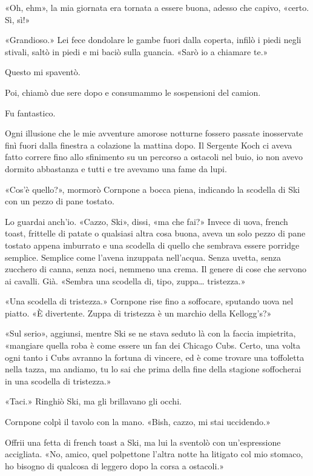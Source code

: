 «Oh, ehm», la mia giornata era tornata a essere buona, adesso che
capivo, «certo. Sì, sì!»

«Grandioso.» Lei fece dondolare le gambe fuori dalla coperta, infilò i
piedi negli stivali, saltò in piedi e mi baciò sulla guancia. «Sarò io a
chiamare te.»

Questo mi spaventò.

Poi, chiamò due sere dopo e consumammo le sospensioni del camion.

Fu fantastico.

\hfill\break

Ogni illusione che le mie avventure amorose notturne fossero passate
inosservate finì fuori dalla finestra a colazione la mattina dopo. Il
Sergente Koch ci aveva fatto correre fino allo sfinimento su un percorso
a ostacoli nel buio, io non avevo dormito abbastanza e tutti e tre
avevamo una fame da lupi.

«Cos'è quello?», mormorò Cornpone a bocca piena, indicando la scodella
di Ski con un pezzo di pane tostato.

Lo guardai anch'io. «Cazzo, Ski», dissi, «ma che fai?» Invece di uova,
french toast, frittelle di patate o qualsiasi altra cosa buona, aveva un
solo pezzo di pane tostato appena imburrato e una scodella di quello che
sembrava essere porridge semplice. Semplice come l'avena inzuppata
nell'acqua. Senza uvetta, senza zucchero di canna, senza noci, nemmeno
una crema. Il genere di cose che servono ai cavalli. Già. «Sembra una
scodella di, tipo, zuppa\ldots{} tristezza.»

«Una scodella di tristezza.» Cornpone rise fino a soffocare, sputando
uova nel piatto. «È divertente. Zuppa di tristezza è un marchio della
Kellogg's?»

«Sul serio», aggiunsi, mentre Ski se ne stava seduto là con la faccia
impietrita, «mangiare quella roba è come essere un fan dei Chicago Cubs.
Certo, una volta ogni tanto i Cubs avranno la fortuna di vincere, ed è
come trovare una toffoletta nella tazza, ma andiamo, tu lo sai che prima
della fine della stagione soffocherai in una scodella di tristezza.»

«Taci.» Ringhiò Ski, ma gli brillavano gli occhi.

Cornpone colpì il tavolo con la mano. «Bish, cazzo, mi stai uccidendo.»

Offrii una fetta di french toast a Ski, ma lui la sventolò con
un'espressione accigliata. «No, amico, quel polpettone l'altra notte ha
litigato col mio stomaco, ho bisogno di qualcosa di leggero dopo la
corsa a ostacoli.»

